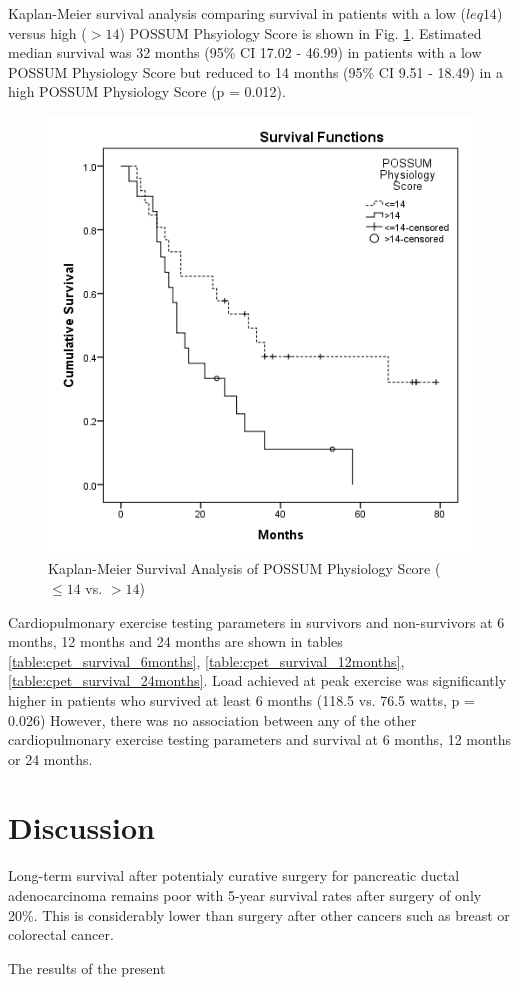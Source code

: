 Kaplan-Meier survival analysis comparing survival in patients with a low ($leq14$) versus high ($>14$) POSSUM Phsyiology Score is shown in Fig. \ref{fig:cpet_survival_km_possum}. Estimated median survival was  32 months (95\% CI 17.02 - 46.99) in patients with a low POSSUM Physiology Score but reduced to 14 months (95\% CI 9.51 - 18.49) in a high POSSUM Physiology Score (p = 0.012).

\begin{figure}[htbp]
	\centering
	\includegraphics[width=0.8\linewidth]{Figures/cpet_survival_km_possum}
	\caption{Kaplan-Meier Survival Analysis of POSSUM Physiology Score ($\leq14$ vs. $>14$)}
	\label{fig:cpet_survival_km_possum}
\end{figure}

Cardiopulmonary exercise testing parameters in survivors and non-survivors at 6 months, 12 months and 24 months are shown in tables \ref{table:cpet_survival_6months}, \ref{table:cpet_survival_12months}, \ref{table:cpet_survival_24months}. Load achieved at peak exercise was significantly higher in patients who survived at least 6 months (118.5 vs. 76.5 watts, p = 0.026) However, there was no association between any of the other cardiopulmonary exercise testing parameters and survival at 6 months, 12 months or 24 months.





\clearpage


\section{Discussion}

Long-term survival after potentialy curative surgery for pancreatic ductal adenocarcinoma remains poor with 5-year survival rates after surgery of only 20\%. This is considerably lower than surgery after other cancers such as breast or colorectal cancer.\parencite{cancerresearchuk_cancer_2014}

The results of the present 